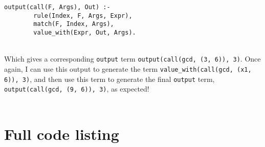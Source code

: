 \begin{lstlisting}[firstnumber=55]
output(call(F, Args), Out) :- 
		rule(Index, F, Args, Expr), 
		match(F, Index, Args),
		value_with(Expr, Out, Args).
\end{lstlisting}
\mbox{} \\
Which gives a corresponding \lstinline{output} term \lstinline{output(call(gcd, (3, 6)), 3)}. Once again, I can use this output to generate the term \lstinline{value_with(call(gcd, (x1, 6)), 3)}, and then use this term to generate the final \lstinline{output} term, \lstinline{output(call(gcd, (9, 6)), 3)}, as expected! \\ \\%

\pagebreak

\section{Full code listing}


\pagebreak
%
%
